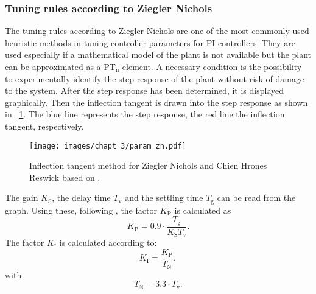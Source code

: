 \subsubsection{Tuning rules according to Ziegler Nichols} \label{chap:ZN}
The tuning rules according to Ziegler Nichols are one of the most commonly used heuristic methods in tuning controller parameters for PI-controllers. They are used especially if a mathematical model of the plant is not available but the plant can be approximated as a PT$_{\mathrm{n}}$-element. \cite{Reg_17}
A necessary condition is the possibility to experimentally identify the step response of the plant without risk of damage to the system. After the step response has been determined, it is displayed graphically. Then the inflection tangent is drawn into the step response as shown in \figurename~\ref{fig:param_zn}. The blue line represents the step response, the red line the inflection tangent, respectively.
\begin{figure}
   \centering
   \texttt{[image: images/chapt\_3/param\_zn.pdf]}
   \caption[Inflection tangent method for Ziegler Nichols and Chien Hrones Reswick]{Inflection tangent method for Ziegler Nichols and Chien Hrones Reswick based on \cite{Reg_17}.}
   \label{fig:param_zn}
 \end{figure}
The gain $K_{\mathrm{S}}$, the delay time $T_{\mathrm{v}}$ and the settling time $T_{\mathrm{g}}$ can be read from the graph.
Using these, following \cite{Reg_17}, the factor $K_{\mathrm{P}}$ is calculated as
\begin{equation}
  K_{\mathrm{P}} = 0.9\cdot\frac{T_{\mathrm{g}}}{K_{\mathrm{S}}T_{\mathrm{v}}}.
  \label{eq:kp_zn}
\end{equation}
The factor $K_{\mathrm{I}}$ is calculated according to:
\begin{equation}
    K_{\mathrm{I}}  = \frac{K_{\mathrm{P}}}{T_{\mathrm{N}}},
 \label{eq:K_I}
\end{equation}
with
\begin{equation}
    T_{\mathrm{N}}  = 3.3\cdot T_{\mathrm{v}}.
 \label{eq:T_N_zn}
\end{equation}

